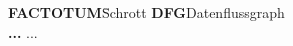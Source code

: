 \documentclass[12pt,a4paper]{report}
\begin{document}
\begin{tabbing}
	\textbf{FACTOTUM}\hspace{1cm}\=Schrott\kill
	\textbf{DFG}\>Datenflussgraph \\
	\textbf{...} \> ...\\
\end{tabbing}

\newpage


\renewcommand{\baselinestretch}{1.3}
\small\normalsize

\listoffigures

\renewcommand{\baselinestretch}{1}
\small\normalsize

\newpage


\renewcommand{\baselinestretch}{1.3}
\small\normalsize

\listoftables

\renewcommand{\baselinestretch}{1}
\small\normalsize

\newpage

\end{document}
